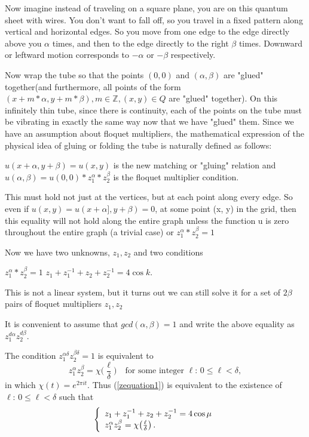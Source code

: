 \documentclass[12pt]{article}
\newcommand{\cchi}[1]{{\textstyle{\chi\big(#1\big)}}}
\begin{document}
Now imagine instead of traveling on a square plane, you are on this quantum sheet with wires. You don't want to fall off, so you travel in a fixed pattern along vertical and horizontal edges. So you move from one edge to the edge directly above you $\alpha$ times, and then to the edge directly to the right $\beta$ times. Downward or leftward motion corresponds to $-\alpha$ or $-\beta$ respectively. 

Now wrap the tube so that the points $(0, 0)$ and $(\alpha, \beta)$ are "glued" together(and furthermore, all points of the form $(x + m*\alpha, y + m*\beta), m \in \mathbb{Z}, (x, y) \in Q$ are "glued" together). On this infinitely thin tube, since there is continuity, each of the points on the tube must be vibrating in exactly the same way now that we have "glued" them. Since we have an assumption about floquet multipliers, the mathematical expression of the physical idea of gluing or folding the tube is naturally defined as follows: 

$u(x + \alpha, y + \beta) = u(x,y)$ is the new matching or "gluing" relation and
$u(\alpha, \beta) = u(0, 0)*z_1^{\alpha}*z_2^{\beta}$ is the floquet multiplier condition.

This must hold not just at the vertices, but at each point along every edge. So even if $u(x, y) = u(x + \alpha], y+ \beta) = 0$, at some point (x, y) in the grid, then this equality will not hold along the entire graph unless the function u is zero throughout the entire graph (a trivial case) or $z_1^{\alpha}*z_2^{\beta} = 1$

Now we have two unknowns, $z_1, z_2$ and two conditions

$z_1^\alpha*z_2^\beta = 1$
$z_1 + z_1^{-1}+ z_2 + z_2^{-1} = 4 \cos{k}$.

This is not a linear system, but it turns out we can still solve it for a set of $2\beta$ pairs of floquet multipliers  ${z_1, z_2}$ 

It is convenient to assume that $gcd(\alpha, \beta) = 1$ and write the above equality as $z_1^{d\alpha}z_2^{d\beta}$.


The condition $z_1^{\alpha\delta} z_2^{\beta\delta} = 1$ is equivalent to 
%
\begin{equation}
  z_1^\alpha z_2^\beta = \cchi{\frac{\ell}{\delta}}
  \quad \text{for some integer } \ell:\,0\leq\ell<\delta,
\end{equation}
%
in which $\chi(t) = e^{2\pi it}$.  Thus (\ref{zequation1}) is equivalent to the existence of $\ell:\,0\leq\ell<\delta$ such that
%
\begin{equation}\label{zequation2}
  \renewcommand{\arraystretch}{1.1}
\left\{
  \begin{array}{l}
    z_1 + z_1^{-1} + z_2 + z_2^{-1} = 4\cos\mu \\
    z_1^\alpha z_2^\beta = \chi\!\left( \frac{\ell}{\delta} \right). \\
  \end{array}
\right.
\end{equation}
%
\end{document}
